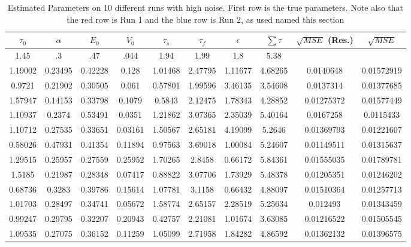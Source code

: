 \begin{table}[t]
\centering
\begin{tabular}{|c | c | c | c | c | c | c | c | c | c |}
\hline 
$\tau_0$ & $\alpha$ & $E_0$    & $V_0$    & $\tau_s$ & $\tau_f$ & $\epsilon$  & $ \sum \tau $ & $\sqrt{MSE}$ (Res.) & $\sqrt{MSE}$\\
\hline 
\rowcolor[gray]{.8}
1.45 & .3 & .47 & .044 & 1.94 & 1.99 & 1.8  & 5.38 &  & \\
\hline 
\hline 
1.19002 & 0.23495 & 0.42228 & 0.128 & 1.01468 & 2.47795 & 1.11677 & 4.68265   &0.0140648  &0.01572919   \\
0.9721 & 0.21902 & 0.30505 & 0.061 & 0.57801 & 1.99596 & 3.46135 & 3.54608    &0.0137314  &0.01377685   \\
1.57947 & 0.14153 & 0.33798 & 0.1079 & 0.5843 & 2.12475 & 1.78343 & 4.28852   &0.01275372 &0.01577449   \\
1.10937 & 0.2374 & 0.53491 & 0.0351 & 1.21862 & 3.07365 & 2.35039 & 5.40164   &0.0167258  &0.0115433    \\
1.10712 & 0.27535 & 0.33651 & 0.03161 & 1.50567 & 2.65181 & 4.19099 & 5.2646  &0.01369793 &0.01221607   \\
0.58026 & 0.47931 & 0.41354 & 0.11894 & 0.97563 & 3.69018 & 1.00084 & 5.24607 &0.01149511 &0.01315637   \\
\rowcolor[rgb]{.9,.5,.5}
1.29515 & 0.25957 & 0.27559 & 0.25952 & 1.70265 & 2.8458 & 0.66172 & 5.84361  &0.01555035 &0.01789781   \\
\rowcolor[rgb]{.5,.5,.9}
1.5185 & 0.21987 & 0.28348 & 0.07417 & 0.88822 & 3.07706 & 1.73929 & 5.48378  &0.01205351 &0.01246202   \\
0.68736 & 0.3283 & 0.39786 & 0.15614 & 1.07781 & 3.1158 & 0.66432 & 4.88097   &0.01510364 &0.01257713   \\
1.01703 & 0.28497 & 0.34741 & 0.05672 & 1.58774 & 2.65157 & 2.28519 & 5.25634 &0.012493   &0.01343459   \\
0.99247 & 0.29795 & 0.32207 & 0.20943 & 0.42757 & 2.21081 & 1.01674 & 3.63085 &0.01216522 &0.01505545   \\
\hline                                                                          
1.09535 & 0.27075 & 0.36152 & 0.11259 & 1.05099 & 2.71958 & 1.84282 & 4.86592 &0.01362132  &0.01396575\\
\hline 
\end{tabular}
\caption{Estimated Parameters on 10 different runs with high noise. First row is the true parameters.
Note also that the red row is Run 1 and the blue row is Run 2, as used named this section}
\label{tab:HighNoiseResults} 
\end{table}

